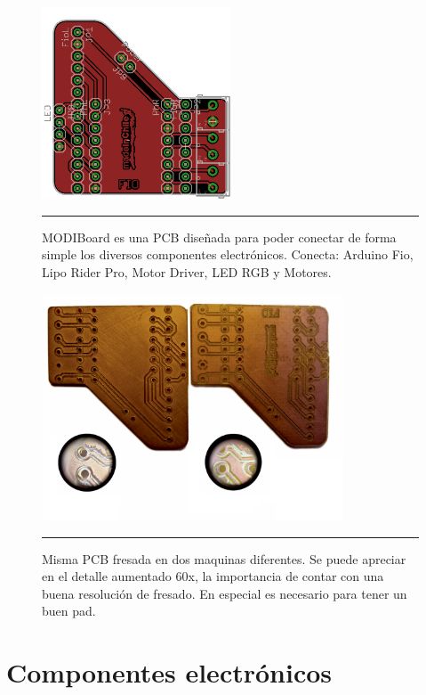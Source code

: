 \begin{figure}[htbp]
	\centering
		\includegraphics[width=0.5\textwidth]{./Figures/MODI/pcbmodi.png}
		\rule{35em}{0.5pt}
	\caption[pcbeagle]{MODIBoard es una PCB diseñada para poder conectar de forma simple los diversos componentes electrónicos. Conecta: Arduino Fio, Lipo Rider Pro, Motor Driver, LED RGB y Motores.}
	\label{fig:pcbeagle}
\end{figure}

\begin{figure}[htbp]
	\centering
		\includegraphics[width=0.8\textwidth]{./Pictures/pcb.jpg}
		\rule{35em}{0.5pt}
	\caption[pcb]{Misma PCB fresada en dos maquinas diferentes. Se puede apreciar en el detalle aumentado 60x, la importancia de contar con una buena resolución de fresado. En especial es necesario para tener un buen pad.}
	\label{fig:pcb}
\end{figure}

\section{Componentes electrónicos}

